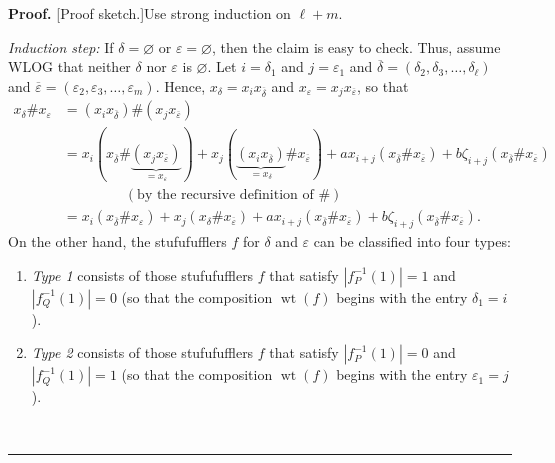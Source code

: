 \documentclass[numbers=enddot,12pt,final,onecolumn,notitlepage]{scrartcl}%
\theoremstyle{definition}
\newenvironment{proof}[1][Proof]{\noindent\textbf{#1.} }{\ \rule{0.5em}{0.5em}}
\begin{document}
\begin{proof}
[Proof sketch.]Use strong induction on $\ell+m$.

\textit{Induction step:} If $\delta=\varnothing$ or $\varepsilon=\varnothing$,
then the claim is easy to check. Thus, assume WLOG that neither $\delta$ nor
$\varepsilon$ is $\varnothing$. Let $i=\delta_{1}$ and $j=\varepsilon_{1}$ and
$\overline{\delta}=\left(  \delta_{2},\delta_{3},\ldots,\delta_{\ell}\right)
$ and $\overline{\varepsilon}=\left(  \varepsilon_{2},\varepsilon_{3}%
,\ldots,\varepsilon_{m}\right)  $. Hence, $x_{\delta}=x_{i}x_{\overline
{\delta}}$ and $x_{\varepsilon}=x_{j}x_{\overline{\varepsilon}}$, so that%
\begin{align}
x_{\delta}\#x_{\varepsilon}  &  =\left(  x_{i}x_{\overline{\delta}}\right)
\#\left(  x_{j}x_{\overline{\varepsilon}}\right) \nonumber\\
&  =x_{i}\left(  x_{\overline{\delta}}\#\underbrace{\left(  x_{j}%
x_{\overline{\varepsilon}}\right)  }_{=x_{\varepsilon}}\right)  +x_{j}\left(
\underbrace{\left(  x_{i}x_{\overline{\delta}}\right)  }_{=x_{\delta}%
}\#x_{\overline{\varepsilon}}\right)  +ax_{i+j}\left(  x_{\overline{\delta}%
}\#x_{\overline{\varepsilon}}\right)  +b\zeta_{i+j}\left(  x_{\overline
{\delta}}\#x_{\overline{\varepsilon}}\right) \nonumber\\
&  \ \ \ \ \ \ \ \ \ \ \ \ \ \ \ \ \ \ \ \ \left(  \text{by the recursive
definition of }\#\right) \nonumber\\
&  =x_{i}\left(  x_{\overline{\delta}}\#x_{\varepsilon}\right)  +x_{j}\left(
x_{\delta}\#x_{\overline{\varepsilon}}\right)  +ax_{i+j}\left(  x_{\overline
{\delta}}\#x_{\overline{\varepsilon}}\right)  +b\zeta_{i+j}\left(
x_{\overline{\delta}}\#x_{\overline{\varepsilon}}\right)  .
\label{pf.prop.stufufuf.explicit.1}%
\end{align}
On the other hand, the stufufufflers $f$ for $\delta$ and $\varepsilon$ can be
classified into four types:

\begin{enumerate}
\item \textit{Type 1} consists of those stufufufflers $f$ that satisfy
$\left\vert f_{P}^{-1}\left(  1\right)  \right\vert =1$ and $\left\vert
f_{Q}^{-1}\left(  1\right)  \right\vert =0$ (so that the composition
$\operatorname*{wt}\left(  f\right)  $ begins with the entry $\delta_{1}=i$).

\item \textit{Type 2} consists of those stufufufflers $f$ that satisfy
$\left\vert f_{P}^{-1}\left(  1\right)  \right\vert =0$ and $\left\vert
f_{Q}^{-1}\left(  1\right)  \right\vert =1$ (so that the composition
$\operatorname*{wt}\left(  f\right)  $ begins with the entry $\varepsilon
_{1}=j$).


\end{enumerate}
\end{proof}
\end{document}

